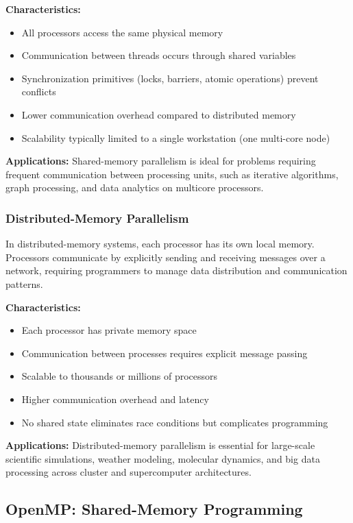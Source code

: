 \textbf{Characteristics:}
\begin{itemize}
    \item All processors access the same physical memory
    \item Communication between threads occurs through shared variables
    \item Synchronization primitives (locks, barriers, atomic operations) prevent conflicts
    \item Lower communication overhead compared to distributed memory
    \item Scalability typically limited to a single workstation (one multi-core node)
\end{itemize}

\textbf{Applications:} Shared-memory parallelism is ideal for problems requiring frequent communication between processing units, such as iterative algorithms, graph processing, and data analytics on multicore processors.

\subsubsection*{Distributed-Memory Parallelism}

In distributed-memory systems, each processor has its own local memory. Processors communicate by explicitly sending and receiving messages over a network, requiring programmers to manage data distribution and communication patterns.

\textbf{Characteristics:}
\begin{itemize}
    \item Each processor has private memory space
    \item Communication between processes requires explicit message passing
    \item Scalable to thousands or millions of processors
    \item Higher communication overhead and latency
    \item No shared state eliminates race conditions but complicates programming
\end{itemize}

\textbf{Applications:} Distributed-memory parallelism is essential for large-scale scientific simulations, weather modeling, molecular dynamics, and big data processing across cluster and supercomputer architectures.

\subsection{OpenMP: Shared-Memory Programming}
\label{subsec:openmp}

